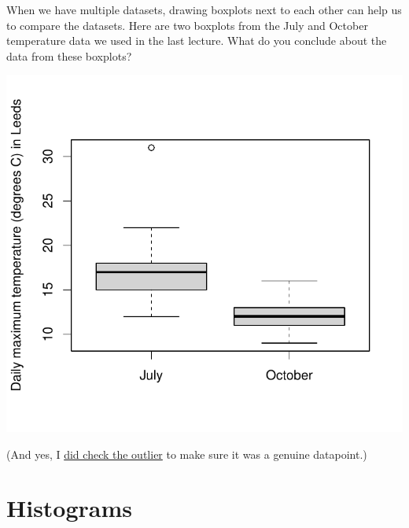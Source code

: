\documentclass[
  a4paper,
]{book}
\newenvironment{Shaded}{\begin{snugshade}}{\end{snugshade}}
\newcommand{\AttributeTok}[1]{\textcolor[rgb]{0.13,0.29,0.53}{#1}}
\newcommand{\FunctionTok}[1]{\textcolor[rgb]{0.13,0.29,0.53}{\textbf{#1}}}
\newcommand{\NormalTok}[1]{#1}
\newcommand{\SpecialCharTok}[1]{\textcolor[rgb]{0.81,0.36,0.00}{\textbf{#1}}}
\newcommand{\StringTok}[1]{\textcolor[rgb]{0.31,0.60,0.02}{#1}}
\theoremstyle{definition}
\theoremstyle{definition}
\theoremstyle{definition}
\theoremstyle{definition}
\theoremstyle{remark}
\begin{document}
When we have multiple datasets, drawing boxplots next to each other can help us to compare the datasets. Here are two boxplots from the July and October temperature data we used in the last lecture. What do you conclude about the data from these boxplots?

\begin{Shaded}
\end{Shaded}

\begin{center}\includegraphics{math1710_files/figure-latex/boxplot-temp-1} \end{center}

(And yes, I \href{https://www.metoffice.gov.uk/binaries/content/assets/metofficegovuk/pdf/weather/learn-about/uk-past-events/interesting/2020/2020_05_july_temperature.pdf}{did check the outlier} to make sure it was a genuine datapoint.)

\hypertarget{histograms}{%
\section{Histograms}\label{histograms}}
\end{document}
